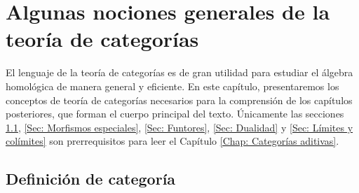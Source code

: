 \documentclass[tesis]{subfiles}
\begin{document}
\chapter{Algunas nociones generales de la teoría de categorías} \label{Chap: Algunas nociones generales de la teoría de categorías}    

El lenguaje de la teoría de categorías es de gran utilidad para estudiar el álgebra homológica de manera general y eficiente. En este capítulo, presentaremos los conceptos de teoría de categorías necesarios para la comprensión de los capítulos posteriores, que forman el cuerpo principal del texto. Únicamente las secciones \ref{Sec: Definición de categoría}, \ref{Sec: Morfismos especiales}, \ref{Sec: Funtores}, \ref{Sec: Dualidad} y \ref{Sec: Límites y colímites} son prerrequisitos para leer el Capítulo \ref{Chap: Categorías aditivas}. %

\section{Definición de categoría} \label{Sec: Definición de categoría}
\end{document}
